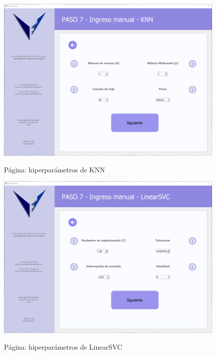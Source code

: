 \begin{figure}[H]
    \centering
    \caption{Página: hiperparámetros de KNN}
    \includegraphics[width=\textwidth]{views/knn.png}
    \label{fig:knn}
\end{figure}

\begin{figure}[H]
    \centering
    \caption{Página: hiperparámetros de LinearSVC}
    \includegraphics[width=\textwidth]{views/linearsvc.png}
    \label{fig:linearsvc}
\end{figure}

